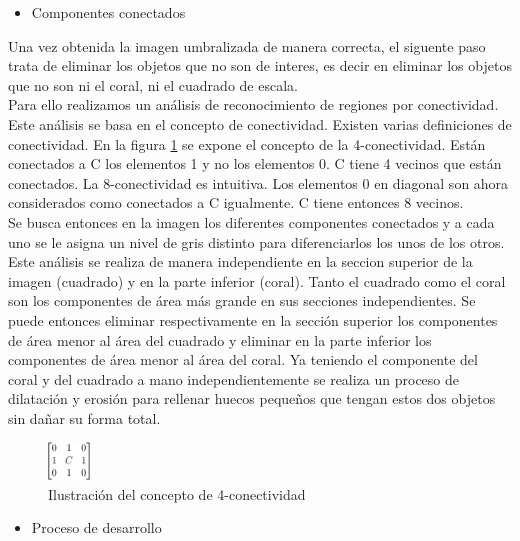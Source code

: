 \documentclass[journal]{IEEEtran}
\begin{document}
\begin{itemize}
    \item Componentes conectados
\end{itemize}

\begin{par}
Una vez obtenida la imagen umbralizada de manera correcta, el siguente paso trata de eliminar los objetos que no son de interes, es
decir en eliminar los objetos que no son ni el coral, ni el cuadrado de escala.\\
Para ello realizamos un análisis de reconocimiento de regiones por conectividad. Este análisis se basa en el concepto de conectividad.
Existen varias definiciones de conectividad. En la figura \ref{fg:connect} se expone el concepto de la 4-conectividad. Están conectados
a C los elementos 1 y no los elementos 0. C tiene 4 vecinos que están conectados. La 8-conectividad es intuitiva. Los elementos 0
en diagonal son ahora considerados como conectados a C igualmente. C tiene entonces 8 vecinos.\\
Se busca entonces en la imagen los diferentes componentes conectados y a cada uno se le asigna un nivel de gris distinto para diferenciarlos
los unos de los otros. Este análisis se realiza de manera independiente en la seccion superior de la imagen (cuadrado) y en la parte 
inferior (coral). Tanto el cuadrado como el coral son los componentes de área más grande en sus secciones independientes. Se puede entonces
eliminar respectivamente en la sección superior los componentes de área menor al área del cuadrado y eliminar en la parte inferior
los componentes de área menor al área del coral. Ya teniendo el componente del coral y del cuadrado a mano independientemente se realiza un proceso de dilatación y erosión para rellenar huecos pequeños que tengan estos dos objetos sin dañar su forma total.
\end{par}

\begin{figure}[ht]
\begin{center}
\includegraphics[width=0.10\textwidth]{resultados/connect} %
\caption{Ilustración del concepto de 4-conectividad}
\label{fg:connect}
\end{center}
\end{figure}
\FloatBarrier

\begin{itemize}
    \item Proceso de desarrollo
\end{itemize}
\end{document}
